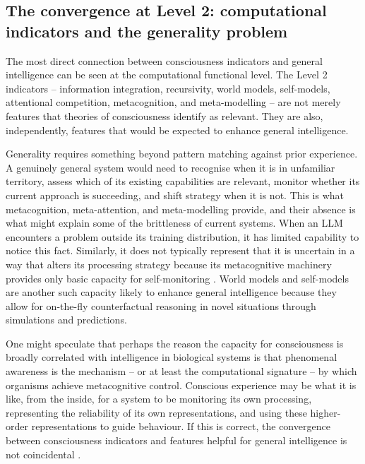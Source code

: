 \documentclass[11pt, a4paper, onecolumn, gdm]{google}
\begin{document}
\subsection{The convergence at Level 2: computational indicators and the generality problem}\label{the-convergence-at-level-2-computational-indicators-and-the-generality-problem}

The most direct connection between consciousness indicators and general intelligence can be seen at the computational functional level.
The Level 2 indicators -- information integration, recursivity, world models, self-models, attentional competition, metacognition, and meta-modelling -- are not merely features that theories of consciousness identify as relevant.
They are also, independently, features that would be expected to enhance general intelligence.

Generality requires something beyond pattern matching against prior experience.
A genuinely general system would need to recognise when it is in unfamiliar territory, assess which of its existing capabilities are relevant, monitor whether its current approach is succeeding, and shift strategy when it is not.
This is what metacognition, meta-attention, and meta-modelling provide, and their absence is what might explain some of the brittleness of current systems.
When an LLM encounters a problem outside its training distribution, it has limited capability to notice this fact.
Similarly, it does not typically represent that it is uncertain in a way that alters its processing strategy because its metacognitive machinery provides only basic capacity for self-monitoring \citep{laukkonen2025}.
World models and self-models are another such capacity likely to enhance general intelligence because they allow for on-the-fly counterfactual reasoning in novel situations through simulations and predictions.

One might speculate that perhaps the reason the capacity for consciousness is broadly correlated with intelligence in biological systems is that phenomenal awareness is the mechanism -- or at least the computational signature -- by which organisms achieve metacognitive control.
Conscious experience may be what it is like, from the inside, for a system to be monitoring its own processing, representing the reliability of its own representations, and using these higher-order representations to guide behaviour.
If this is correct, the convergence between consciousness indicators and features helpful for general intelligence is not coincidental \citetext{this identification of consciousness with reflexive self-monitoring is developed by self-representational theories, e.g., \citealp{kriegel2009}; for the related but distinct higher-order tradition, on which the monitoring state is itself unconscious, see \citealp{rosenthal2005} and \citealp{carruthers2000}}.
\end{document}

